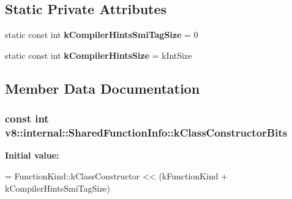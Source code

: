\subsection*{Static Private Attributes}
\begin{DoxyCompactItemize}
\item 
static const int {\bfseries k\+Compiler\+Hints\+Smi\+Tag\+Size} = 0\hypertarget{classv8_1_1internal_1_1_shared_function_info_a733c82f3a61f9cc0899734ac8b105da2}{}\label{classv8_1_1internal_1_1_shared_function_info_a733c82f3a61f9cc0899734ac8b105da2}

\item 
static const int {\bfseries k\+Compiler\+Hints\+Size} = k\+Int\+Size\hypertarget{classv8_1_1internal_1_1_shared_function_info_a27c6ad48aa99d1620cd8c6e1e3b8b0d3}{}\label{classv8_1_1internal_1_1_shared_function_info_a27c6ad48aa99d1620cd8c6e1e3b8b0d3}

\end{DoxyCompactItemize}


\subsection{Member Data Documentation}
\subsubsection[{\texorpdfstring{k\+Class\+Constructor\+Bits}{kClassConstructorBits}}]{\setlength{\rightskip}{0pt plus 5cm}const int v8\+::internal\+::\+Shared\+Function\+Info\+::k\+Class\+Constructor\+Bits\hspace{0.3cm}{\ttfamily [static]}}\hypertarget{classv8_1_1internal_1_1_shared_function_info_aca12d66b02dcb3875c57e5951fed8e4c}{}\label{classv8_1_1internal_1_1_shared_function_info_aca12d66b02dcb3875c57e5951fed8e4c}
{\bfseries Initial value\+:}
\begin{DoxyCode}
=
      FunctionKind::kClassConstructor
      << (kFunctionKind + kCompilerHintsSmiTagSize)
\end{DoxyCode}
